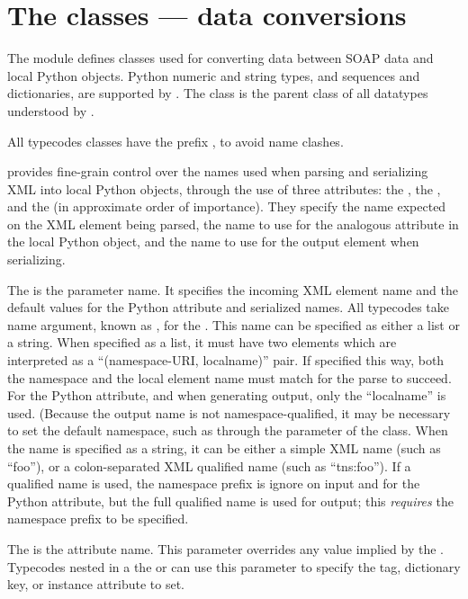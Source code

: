 \chapter{The  classes --- data conversions}

The  module defines classes used for converting data
between SOAP data and local Python objects.
Python numeric and string types, and sequences and dictionaries, are
supported by \ZSI{}.
The  class is the parent class of all datatypes
understood by \ZSI{}.

All typecodes classes have the prefix , to avoid name clashes.

\ZSI{} provides fine-grain control over the names used when parsing and
serializing XML into local Python objects, through the use of three
attributes: the , the , and the 
(in approximate order of importance).  They specify the name expected on
the XML element being parsed, the name to use for the analogous attribute
in the local Python object, and the name to use for the output element
when serializing.

The  is the parameter name. It specifies the incoming
XML element name and the default values for the Python attribute
and serialized names.  All typecodes take name argument, known as
, for the .  This name can be specified as
either a list or a string.  When specified as a list, it must have two
elements which are interpreted as a ``(namespace-URI, localname)'' pair.
If specified this way, both the namespace and the local element name
must match for the parse to succeed.  For the Python attribute, and
when generating output, only the ``localname'' is used.  (Because the
output name is not namespace-qualified, it may be necessary to set the
default namespace, such as through the  parameter of the
 class.  When the name is specified as a string, it
can be either a simple XML name (such as ``foo''), or a colon-separated
XML qualified name (such as ``tns:foo'').  If a qualified name is used,
the namespace prefix is ignore on input and for the Python attribute,
but the full qualified name is used for output; this \emph{requires}
the namespace prefix to be specified.

The  is the attribute name.  This parameter overrides
any value implied by the .  Typecodes nested in a the
 or  can use this parameter to specify
the tag, dictionary key, or instance attribute to set.

